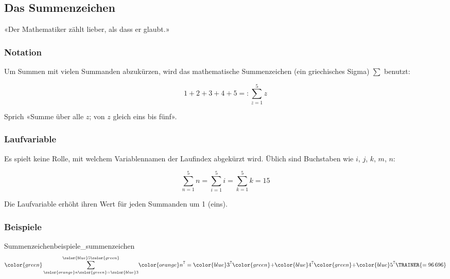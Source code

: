 %
%

\subsection{Das Summenzeichen}\label{Summenzeichen}
«Der Mathematiker zählt lieber, als dass er glaubt.»
\vspace{4mm}




\subsubsection{Notation}
Um Summen mit vielen Summanden abzukürzen, wird das mathematische Summenzeichen (ein
griechisches Sigma) $\sum{}$ benutzt:

\begin{definition}{}{}
  $$1 + 2 + 3 + 4 + 5 =: \sum_{z=1}^{5}{z}$$
\end{definition}

  Sprich «Summe über alle $z$; von
$z$ gleich eins bis fünf».

\subsubsection{Laufvariable}
Es spielt keine Rolle, mit welchem Variablennamen der Laufindex abgekürzt wird. Üblich sind Buchstaben wie $i$, $j$, $k$, $m$, $n$:

$$\sum_{n=1}^{5}{n} = \sum_{i=1}^5{i} = \sum_{k=1}^5{k} = 15$$

Die Laufvariable erhöht ihren Wert für jeden Summanden um 1 (eins).
\newpage

\subsubsection{Beispiele}
\begin{beispiel}{Summenzeichen}{beispiele_summenzeichen}
  $${\color{green}\sum_{{\color{orange}n}{{\color{green}=\color{blue}3}}}^{\color{blue}5\color{green}}}  {\color{orange}n}^7 = {\color{blue}3}^7 {\color{green}+} {\color{blue}4}^7 {\color{green}+} {\color{blue}5}^7\TRAINER{=96\,696}$$
\end{beispiel}

